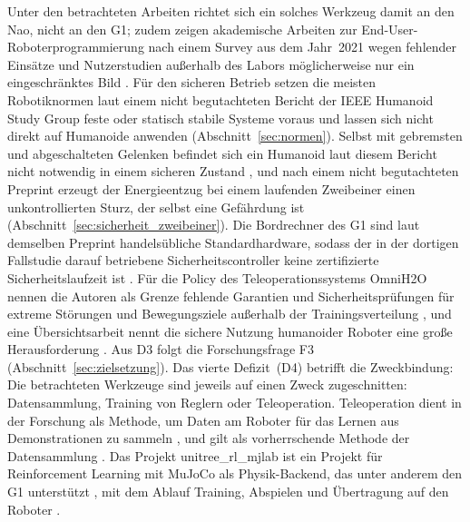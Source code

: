 Unter den betrachteten Arbeiten richtet sich ein solches Werkzeug damit an den Nao, nicht an den G1; zudem zeigen akademische Arbeiten zur End-User-Roboterprogrammierung nach einem Survey aus dem Jahr~2021 wegen fehlender Einsätze und Nutzerstudien außerhalb des Labors möglicherweise nur ein eingeschränktes Bild \cite{Ajaykumar2021}.
Für den sicheren Betrieb setzen die meisten Robotiknormen laut einem nicht begutachteten Bericht der IEEE Humanoid Study Group feste oder statisch stabile Systeme voraus \cite{Prather2025} und lassen sich nicht direkt auf Humanoide anwenden \cite{Prather2025} (Abschnitt~\ref{sec:normen}).
Selbst mit gebremsten und abgeschalteten Gelenken befindet sich ein Humanoid laut diesem Bericht nicht notwendig in einem sicheren Zustand \cite{Prather2025}, und nach einem nicht begutachteten Preprint erzeugt der Energieentzug bei einem laufenden Zweibeiner einen unkontrollierten Sturz, der selbst eine Gefährdung ist \cite{Ding2026} (Abschnitt~\ref{sec:sicherheit_zweibeiner}).
Die Bordrechner des G1 sind laut demselben Preprint handelsübliche Standardhardware, sodass der in der dortigen Fallstudie darauf betriebene Sicherheitscontroller keine zertifizierte Sicherheitslaufzeit ist \cite{Ding2026}.
Für die Policy des Teleoperationssystems OmniH2O nennen die Autoren als Grenze fehlende Garantien und Sicherheitsprüfungen für extreme Störungen und Bewegungsziele außerhalb der Trainingsverteilung \cite{He2024}, und eine Übersichtsarbeit nennt die sichere Nutzung humanoider Roboter eine große Herausforderung \cite{Tong2024}.
Aus D3 folgt die Forschungsfrage F3 (Abschnitt~\ref{sec:zielsetzung}).
%
Das vierte Defizit~(D4) betrifft die Zweckbindung: Die betrachteten Werkzeuge sind jeweils auf einen Zweck zugeschnitten: Datensammlung, Training von Reglern oder Teleoperation.
Teleoperation dient in der Forschung als Methode, um Daten am Roboter für das Lernen aus Demonstrationen zu sammeln \cite{Cheng2024}, und gilt als vorherrschende Methode der Datensammlung \cite{Zhao2025}.
Das Projekt unitree\_rl\_mjlab ist ein Projekt für Reinforcement Learning mit MuJoCo als Physik-Backend, das unter anderem den G1 unterstützt \cite{UnitreeRLMjlab}, mit dem Ablauf Training, Abspielen und Übertragung auf den Roboter \cite{UnitreeRLMjlab}.
